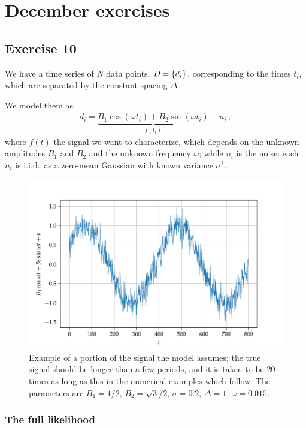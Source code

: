\documentclass[main.tex]{subfiles}
\begin{document}
\section{December exercises}

\subsection{Exercise 10}

We have a time series of \(N\) data points, \(D = \qty{d_i}\), corresponding to the times \(t_i\), which are separated by the constant spacing \(\Delta \).

We model them as 
%
\begin{align}
d_i = \underbrace{B_1  \cos(\omega t_i) + B_2 \sin(\omega t_i)}_{f(t_i)} + n_i
\,,
\end{align}
%
where \(f(t)\) the signal we want to characterize, which depends on the unknown amplitudes \(B_1 \) and \(B_2 \) and the unknown frequency \(\omega \); while \(n_i \) is the noise: each \(n_i\) is i.i.d.\ as a zero-mean Gaussian with known variance \(\sigma^2\). 

\begin{figure}[ht]
\centering
\includegraphics[width=\textwidth]{figures/signal.pdf}
\caption{Example of a portion of the signal the model assumes; the true signal should be longer than a few periods, and it is taken to be 20 times as long as this in the numerical examples which follow. The parameters are \(B_1 = 1/2\), \(B_2 = \sqrt{3} /2\), \(\sigma = 0.2\), \(\Delta = 1\), \(\omega = 0.015\).}
\label{fig:signal}
\end{figure}

\subsubsection{The full likelihood}
\end{document}
